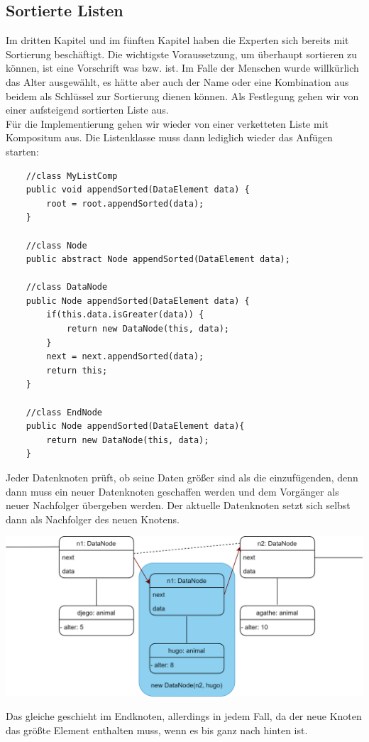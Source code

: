 \documentclass{article}
\begin{document}
\subsection{Sortierte Listen}
Im dritten Kapitel und im fünften Kapitel haben die Experten sich bereits mit Sortierung beschäftigt. Die wichtigste Voraussetzung, um überhaupt sortieren zu können, ist eine Vorschrift was  bzw.  ist. Im Falle der Menschen wurde willkürlich das Alter ausgewählt, es hätte aber auch der Name oder eine Kombination aus beidem als Schlüssel zur Sortierung dienen können. Als Festlegung gehen wir von einer aufsteigend sortierten Liste aus. \\
Für die Implementierung gehen wir wieder von einer verketteten Liste mit Kompositum aus. Die Listenklasse muss dann lediglich wieder das Anfügen starten: 
\begin{verbatim}
    //class MyListComp
    public void appendSorted(DataElement data) {
        root = root.appendSorted(data);
    }

    //class Node 
    public abstract Node appendSorted(DataElement data);

    //class DataNode 
    public Node appendSorted(DataElement data) {
        if(this.data.isGreater(data)) {
            return new DataNode(this, data);
        }
        next = next.appendSorted(data);
        return this;
    }

    //class EndNode
    public Node appendSorted(DataElement data){
        return new DataNode(this, data);
    }
\end{verbatim}
Jeder Datenknoten prüft, ob seine Daten größer sind als die einzufügenden, denn dann muss ein neuer Datenknoten geschaffen werden und dem Vorgänger als neuer Nachfolger übergeben werden. Der aktuelle Datenknoten setzt sich selbst dann als Nachfolger des neuen Knotens. \\
\begin{center}
    \includegraphics[scale=0.2]{../../media/append_sorted_objects.png}   
\end{center}
Das gleiche geschieht im Endknoten, allerdings in jedem Fall, da der neue Knoten das größte Element enthalten muss, wenn es bis ganz nach hinten  ist.
\end{document}
